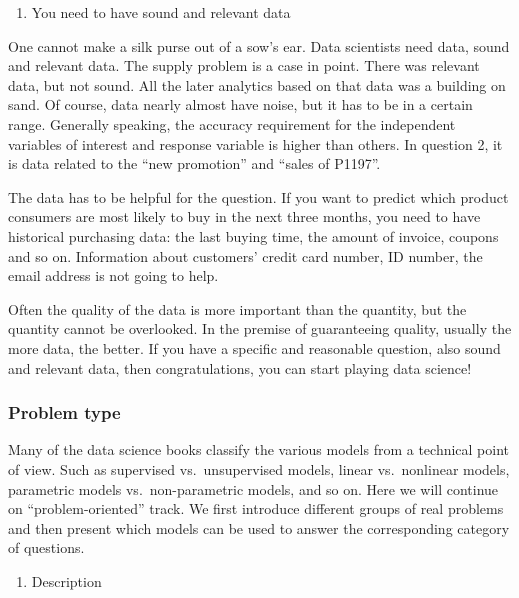 \documentclass[12pt,]{krantz}
\providecommand{\tightlist}{%
  \setlength{\itemsep}{0pt}\setlength{\parskip}{0pt}}
\theoremstyle{definition}
\theoremstyle{definition}
\theoremstyle{definition}
\theoremstyle{remark}
\begin{document}
\begin{enumerate}
\def\labelenumi{\arabic{enumi}.}
\setcounter{enumi}{1}
\tightlist
\item
  You need to have sound and relevant data
\end{enumerate}

One cannot make a silk purse out of a sow's ear. Data scientists need
data, sound and relevant data. The supply problem is a case in point.
There was relevant data, but not sound. All the later analytics based on
that data was a building on sand. Of course, data nearly almost have
noise, but it has to be in a certain range. Generally speaking, the
accuracy requirement for the independent variables of interest and
response variable is higher than others. In question 2, it is data
related to the ``new promotion'' and ``sales of P1197''.

The data has to be helpful for the question. If you want to predict
which product consumers are most likely to buy in the next three months,
you need to have historical purchasing data: the last buying time, the
amount of invoice, coupons and so on. Information about customers'
credit card number, ID number, the email address is not going to help.

Often the quality of the data is more important than the quantity, but
the quantity cannot be overlooked. In the premise of guaranteeing
quality, usually the more data, the better. If you have a specific and
reasonable question, also sound and relevant data, then congratulations,
you can start playing data science!

\subsubsection{Problem type}\label{problem-type}

Many of the data science books classify the various models from a
technical point of view. Such as supervised vs.~unsupervised models,
linear vs.~nonlinear models, parametric models vs.~non-parametric
models, and so on. Here we will continue on ``problem-oriented'' track.
We first introduce different groups of real problems and then present
which models can be used to answer the corresponding category of
questions.

\begin{enumerate}
\def\labelenumi{\arabic{enumi}.}
\tightlist
\item
  Description
\end{enumerate}
\end{document}
